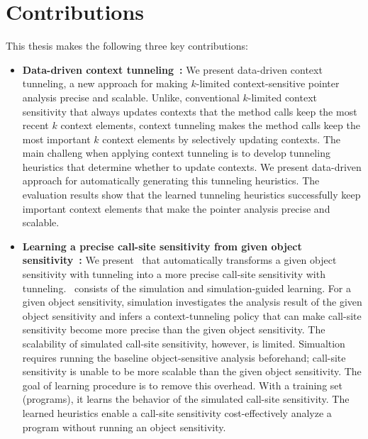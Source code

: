\section{Contributions}
This thesis makes the following three key contributions:



\begin{itemize}
\item {\bf Data-driven context tunneling~\cite{JeJeOh18}:}
  We present data-driven context tunneling, a new approach for making $k$-limited context-sensitive pointer analysis precise and scalable.
  Unlike, conventional $k$-limited context sensitivity that always updates contexts that the method calls keep the most recent $k$ context elements, context tunneling makes the method calls keep the most important $k$ context elements by selectively updating contexts.
  The main challeng when applying context tunneling is to develop tunneling heuristics that determine whether to update contexts. We present data-driven approach for automatically generating this tunneling heuristics. The evaluation results show that the learned tunneling heuristics successfully keep important context elements that make the pointer analysis precise and scalable.


\item {\bf Learning a precise call-site sensitivity from given object sensitivity~\cite{JeOh22}:}
We present \ourtechnique~that automatically transforms a given object sensitivity with tunneling into a more precise call-site sensitivity with tunneling. 
\ourtechnique~consists of the simulation and
simulation-guided learning. For a given object sensitivity, 
simulation investigates the analysis result of the given object sensitivity and infers a context-tunneling policy that can make 
call-site sensitivity become more precise than the given object sensitivity.
The scalability of simulated call-site sensitivity, however, is 
limited. Simualtion requires running the baseline object-sensitive
analysis beforehand; call-site sensitivity is unable to be more scalable than the given object sensitivity.
The goal of learning procedure is to remove this overhead. 
With a training set (programs), it learns the behavior of the simulated call-site sensitivity.
The learned heuristics enable a call-site sensitivity cost-effectively analyze a program without running an object sensitivity.




\end{itemize}
